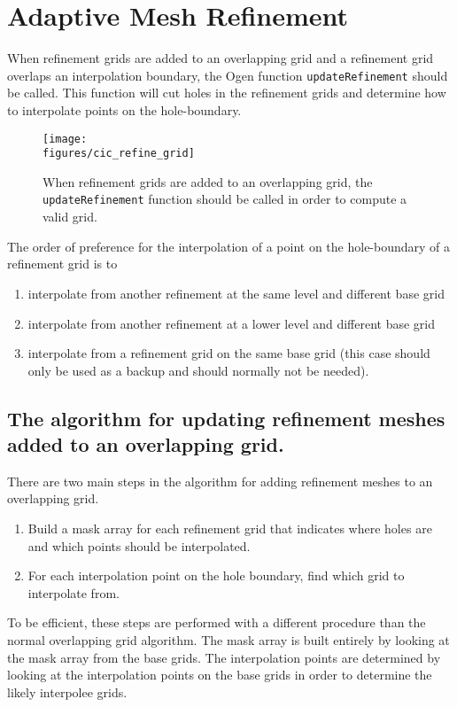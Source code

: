 \clearpage
\section{Adaptive Mesh Refinement} 

  When refinement grids are added to an overlapping grid and a refinement grid
overlaps an interpolation boundary, the Ogen function {\tt updateRefinement}
should be called. This function will cut holes in the refinement grids and
determine how to interpolate points on the hole-boundary. 

\begin{figure}[H]
\begin{center}
   \texttt{[image: \\figures/cic\_refine\_grid]}
\end{center}
\caption{When refinement grids are added to an overlapping grid, the {\tt updateRefinement} function
   should be called in order to compute a valid grid.}
\end{figure}

The order of preference for the interpolation of a point on the hole-boundary
of a refinement grid is to
\begin{enumerate}
   \item interpolate from another refinement at the same level and different base grid
   \item interpolate from another refinement at a lower level and different base grid
   \item interpolate from a refinement grid on the same base grid (this case should only be used as a backup
         and should normally not be needed).
\end{enumerate}
  

\subsection{The algorithm for updating refinement meshes added to an overlapping grid.}

  There are two main steps in the algorithm for adding refinement meshes to an overlapping grid.
\begin{enumerate}
  \item Build a mask array for each refinement grid that indicates where holes are and which points
      should be interpolated.
  \item For each interpolation point on the hole boundary, find which grid to interpolate from.
\end{enumerate}
To be efficient, these steps are performed with a different procedure than the normal overlapping
grid algorithm. The mask array is built entirely by looking at the mask array from the base grids.
The interpolation points are determined by looking at the interpolation points on the base grids
in order to determine the likely interpolee grids.





